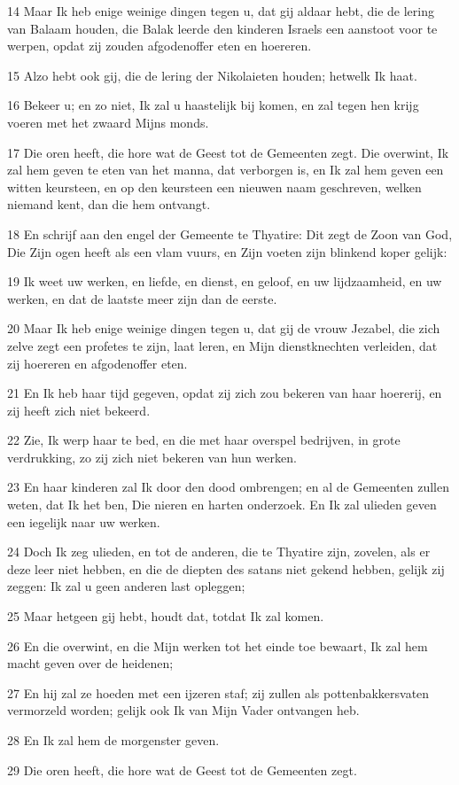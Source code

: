 \par 14 Maar Ik heb enige weinige dingen tegen u, dat gij aldaar hebt, die de lering van Balaam houden, die Balak leerde den kinderen Israels een aanstoot voor te werpen, opdat zij zouden afgodenoffer eten en hoereren.
\par 15 Alzo hebt ook gij, die de lering der Nikolaieten houden; hetwelk Ik haat.
\par 16 Bekeer u; en zo niet, Ik zal u haastelijk bij komen, en zal tegen hen krijg voeren met het zwaard Mijns monds.
\par 17 Die oren heeft, die hore wat de Geest tot de Gemeenten zegt. Die overwint, Ik zal hem geven te eten van het manna, dat verborgen is, en Ik zal hem geven een witten keursteen, en op den keursteen een nieuwen naam geschreven, welken niemand kent, dan die hem ontvangt.
\par 18 En schrijf aan den engel der Gemeente te Thyatire: Dit zegt de Zoon van God, Die Zijn ogen heeft als een vlam vuurs, en Zijn voeten zijn blinkend koper gelijk:
\par 19 Ik weet uw werken, en liefde, en dienst, en geloof, en uw lijdzaamheid, en uw werken, en dat de laatste meer zijn dan de eerste.
\par 20 Maar Ik heb enige weinige dingen tegen u, dat gij de vrouw Jezabel, die zich zelve zegt een profetes te zijn, laat leren, en Mijn dienstknechten verleiden, dat zij hoereren en afgodenoffer eten.
\par 21 En Ik heb haar tijd gegeven, opdat zij zich zou bekeren van haar hoererij, en zij heeft zich niet bekeerd.
\par 22 Zie, Ik werp haar te bed, en die met haar overspel bedrijven, in grote verdrukking, zo zij zich niet bekeren van hun werken.
\par 23 En haar kinderen zal Ik door den dood ombrengen; en al de Gemeenten zullen weten, dat Ik het ben, Die nieren en harten onderzoek. En Ik zal ulieden geven een iegelijk naar uw werken.
\par 24 Doch Ik zeg ulieden, en tot de anderen, die te Thyatire zijn, zovelen, als er deze leer niet hebben, en die de diepten des satans niet gekend hebben, gelijk zij zeggen: Ik zal u geen anderen last opleggen;
\par 25 Maar hetgeen gij hebt, houdt dat, totdat Ik zal komen.
\par 26 En die overwint, en die Mijn werken tot het einde toe bewaart, Ik zal hem macht geven over de heidenen;
\par 27 En hij zal ze hoeden met een ijzeren staf; zij zullen als pottenbakkersvaten vermorzeld worden; gelijk ook Ik van Mijn Vader ontvangen heb.
\par 28 En Ik zal hem de morgenster geven.
\par 29 Die oren heeft, die hore wat de Geest tot de Gemeenten zegt.

